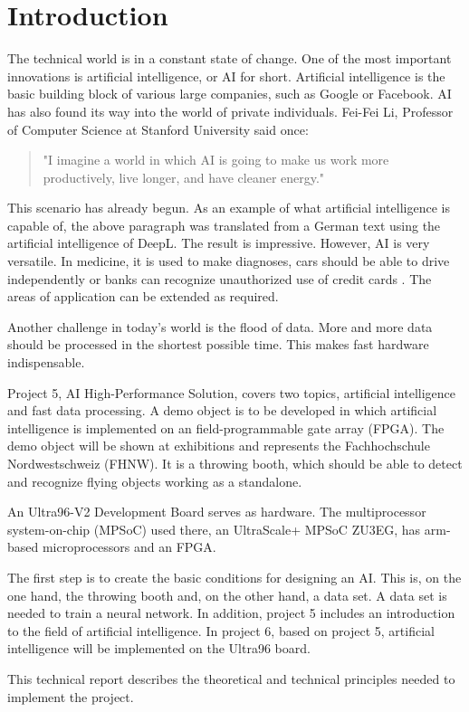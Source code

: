 \section{Introduction}
\label{sec:introduction}
The technical world is in a constant state of change. One of the most important innovations is artificial intelligence, or AI for short.
Artificial intelligence is the basic building block of various large companies, such as Google or Facebook.
AI has also found its way into the world of private individuals.
Fei-Fei Li, Professor of Computer Science at Stanford University said once:
\begin{quote}
	"I imagine a world in which AI is going to make us work more productively, live longer, and have cleaner energy."\cite{quotes_future}
\end{quote}
This scenario has already begun. As an example of what artificial intelligence is capable of, the above paragraph was translated from a German text using the artificial intelligence of DeepL. The result is impressive.
However, AI is very versatile. In medicine, it is used to make diagnoses, cars should be able to drive independently or banks can recognize unauthorized use of credit cards \cite{artificial_intelligence_a_modern_approach}. 
The areas of application can be extended as required.

Another challenge in today's world is the flood of data. More and more data should be processed in the shortest possible time. This makes fast hardware indispensable.

Project 5, AI High-Performance Solution, covers two topics, artificial intelligence and fast data processing.
A demo object is to be developed in which artificial intelligence is implemented on an field-programmable gate array (FPGA).
The demo object will be shown at exhibitions and represents the Fachhochschule Nordwestschweiz (FHNW).
It is a throwing booth, which should be able to detect and recognize flying objects working as a standalone.

An Ultra96-V2 Development Board serves as hardware.
The multiprocessor system-on-chip (MPSoC) used there, an UltraScale+ MPSoC ZU3EG, has arm-based microprocessors and an FPGA.

The first step is to create the basic conditions for designing an AI.
This is, on the one hand, the throwing booth and, on the other hand, a data set. A data set is needed to train a neural network.
In addition, project 5 includes an introduction to the field of artificial intelligence.
In project 6, based on project 5, artificial intelligence will be implemented on the Ultra96 board.

This technical report describes the theoretical and technical principles needed to implement the project.